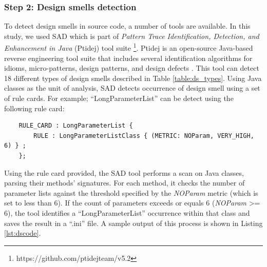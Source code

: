 \documentclass[AMA,Times1COL]{WileyNJDv5} %
\begin{document}
\subsubsection*{Step 2: Design smells detection}
To detect design smells in source code, a number of tools are available. In this study, we used SAD which is part of  \textit{Pattern Trace Identification, Detection, and Enhancement in Java} (Ptidej) tool suite \footnote{https://github.com/ptidejteam/v5.2}. Ptidej is an open-source Java-based reverse engineering tool suite that includes several identification algorithms for idioms, micro-patterns, design patterns, and design defects \cite{gueheneuc2007ptidej}. This tool can detect 18 different types of design smells described in Table \ref{table:ds_types}. Using Java classes as the unit of analysis, SAD detects occurrence of design smell using a set of rule cards. For example; ``LongParameterList'' can be detect using the following rule card:
\begin{verbatim}
	RULE_CARD : LongParameterList { 
		RULE : LongParameterListClass { (METRIC: NOParam, VERY_HIGH, 6) } ; 
	};
\end{verbatim}
Using the rule card provided, the SAD tool performs a scan on Java classes, parsing their methods' signatures. For each method, it checks the number of parameter lists against the threshold specified by the \textit{NOParam} metric (which is set to less than 6). If the count of parameters exceeds or equals 6 (\textit{NOParam} >= 6), the tool identifies a ``LongParameterList'' occurrence within that class and saves the result in a ``.ini'' file. A sample output of this process is shown in Listing \ref{lst:dscode}.
\end{document}
